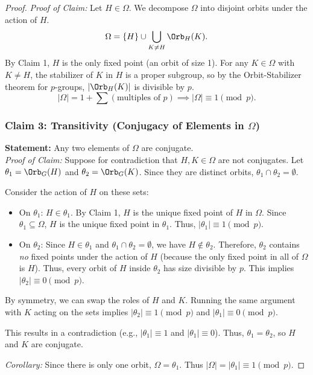 \documentclass[a4paper,12pt]{article}
\begin{document}
\begin{proof}
    \textit{Proof of Claim:}
    Let $H \in \Omega$. We decompose $\Omega$ into disjoint orbits under the action of $H$.
    \[
    \Omega = \{H\} \cup \bigcup_{K \neq H} \Orb_H(K).
    \]
    By Claim 1, $H$ is the only fixed point (an orbit of size 1). For any $K \in \Omega$ with $K \neq H$, the stabilizer of $K$ in $H$ is a proper subgroup, so by the Orbit-Stabilizer theorem for $p$-groups, $|\Orb_H(K)|$ is divisible by $p$.
    \[
    |\Omega| = 1 + \sum (\text{multiples of } p) \implies |\Omega| \equiv 1 \pmod{p}.
    \]

    \subsubsection*{Claim 3: Transitivity (Conjugacy of Elements in $\Omega$)}
    \textbf{Statement:} Any two elements of $\Omega$ are conjugate.\\
    \textit{Proof of Claim:}
    Suppose for contradiction that $H, K \in \Omega$ are not conjugates. Let $\theta_1 = \Orb_G(H)$ and $\theta_2 = \Orb_G(K)$. Since they are distinct orbits, $\theta_1 \cap \theta_2 = \emptyset$.
    
    Consider the action of $H$ on these sets:
    \begin{itemize}
        \item On $\theta_1$: $H \in \theta_1$. By Claim 1, $H$ is the unique fixed point of $H$ in $\Omega$. Since $\theta_1 \subseteq \Omega$, $H$ is the unique fixed point in $\theta_1$.
        Thus, $|\theta_1| \equiv 1 \pmod{p}$.
        
        \item On $\theta_2$: Since $H \in \theta_1$ and $\theta_1 \cap \theta_2 = \emptyset$, we have $H \notin \theta_2$.
        Therefore, $\theta_2$ contains \emph{no} fixed points under the action of $H$ (because the only fixed point in all of $\Omega$ is $H$).
        Thus, every orbit of $H$ inside $\theta_2$ has size divisible by $p$.
        This implies $|\theta_2| \equiv 0 \pmod{p}$.
    \end{itemize}
    
    By symmetry, we can swap the roles of $H$ and $K$. Running the same argument with $K$ acting on the sets implies $|\theta_2| \equiv 1 \pmod{p}$ and $|\theta_1| \equiv 0 \pmod{p}$.
    
    This results in a contradiction (e.g., $|\theta_1| \equiv 1$ and $|\theta_1| \equiv 0$). Thus, $\theta_1 = \theta_2$, so $H$ and $K$ are conjugate.
    
    \textit{Corollary:} Since there is only one orbit, $\Omega = \theta_1$. Thus $|\Omega| = |\theta_1| \equiv 1 \pmod{p}$.


\end{proof}
\end{document}
